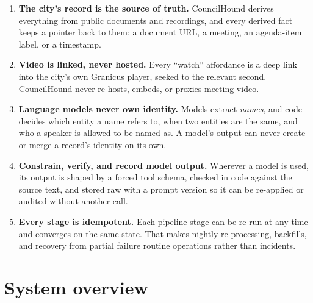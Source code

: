 \documentclass[11pt]{article}
\begin{document}
\begin{enumerate}
\item \textbf{The city's record is the source of truth.} CouncilHound derives everything
      from public documents and recordings, and every derived fact keeps a pointer back to
      them: a document URL, a meeting, an agenda-item label, or a timestamp.
\item \textbf{Video is linked, never hosted.} Every ``watch'' affordance is a deep link
      into the city's own Granicus player, seeked to the relevant second. CouncilHound
      never re-hosts, embeds, or proxies meeting video.
\item \textbf{Language models never own identity.} Models extract \emph{names}, and code
      decides which entity a name refers to, when two entities are the same, and who a
      speaker is allowed to be named as. A model's output can never create or merge a
      record's identity on its own.
\item \textbf{Constrain, verify, and record model output.} Wherever a model is used, its
      output is shaped by a forced tool schema, checked in code against the source text,
      and stored raw with a prompt version so it can be re-applied or audited without
      another call.
\item \textbf{Every stage is idempotent.} Each pipeline stage can be re-run at any time
      and converges on the same state. That makes nightly re-processing, backfills, and
      recovery from partial failure routine operations rather than incidents.
\end{enumerate}

\section{System overview}
\end{document}
